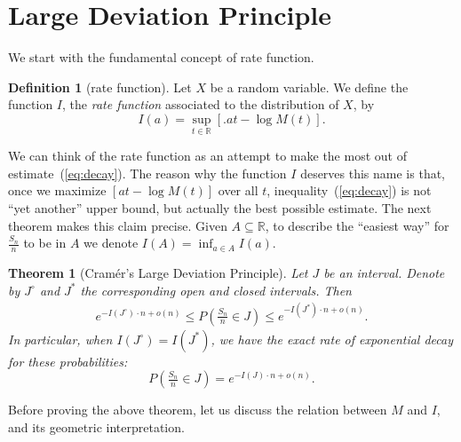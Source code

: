 \documentclass[12pt]{article}
\newtheorem{theorem}[equation]{Theorem}
\theoremstyle{definition}
\newtheorem{definition}[equation]{Definition}
\renewcommand{\P}{\mathbb{P}}
\newcommand{\R}{\mathbb{R}}
\renewcommand{\ge}{\geqslant}
\renewcommand{\le}{\leqslant}
\renewcommand{\t}{t}
\renewcommand{\P}{P}
\begin{document}
\section{Large Deviation Principle}


We start with the fundamental concept of rate function.

\begin{definition}
[rate function]
Let $X$ be a random variable.
We define the function $I$, the \emph{rate function} associated to the distribution of $X$, by
\[
I(a) = \sup_{\t \in \R} \left[ \big. a\t - \log M(\t) \right]
.
\]
\end{definition}

We can think of the rate function as an attempt to make the most out of estimate~(\ref{eq:decay}).
The reason why the function $I$ deserves this name is that,
once we maximize $[a\t - \log M(\t)]$ over all $\t$,
inequality~(\ref{eq:decay}) is not ``yet another'' upper bound, but actually the best possible estimate.
The next theorem makes this claim precise.
Given $A \subseteq \R$, to describe the ``easiest way'' for $\frac{S_n}{n}$ to be in $A$ we
denote
\(
\displaystyle
I(A) = \inf_{a\in A} I(a)
.
\)

\begin{theorem}
[Cramér's Large Deviation Principle]
\label{thm:cramer}
Let $J$ be an interval.
Denote by $J^\circ$ and $J^*$ the corresponding open and closed intervals.
Then
\begin{align*}
e^{-I(J^\circ) \cdot n + o(n)}
\le
\P\left( \tfrac{S_n}{n} \in J \right)
\le
e^{-I(J^*) \cdot n + o(n)}
.
\end{align*}
In particular, when $I(J^\circ) = I(J^*)$, we have the exact rate of exponential decay for these probabilities:
\[
\P\left( \tfrac{S_n}{n} \in J \right) = e^{-I(J) \cdot n + o(n)}
.
\]
\end{theorem}



Before proving the above theorem, let us discuss the relation between $M$ and $I$, and its geometric interpretation.
\end{document}
